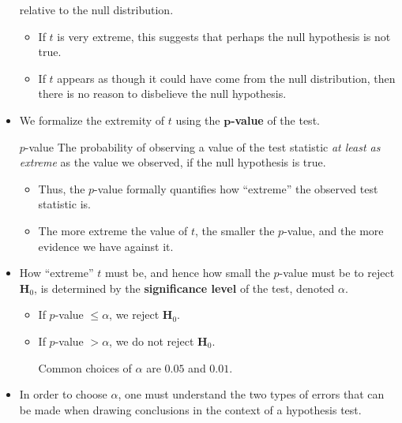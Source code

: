 \begin{itemize}
          relative to the null distribution.
          \begin{itemize}
              \item If $ t $ is very extreme, this suggests that perhaps the null hypothesis
                    is not true.
              \item If $ t $ appears as though it could have come from the null distribution, then
                    there is no reason to disbelieve the null hypothesis.
          \end{itemize}
    \item We formalize the extremity of $ t $ using the \textbf{$ \symbf{p} $-value} of the test.

          \begin{Definition}{$ p $-value}{}
              The probability of observing a value of the test statistic \emph{at least as extreme}
              as the value we observed, if the null hypothesis is true.
          \end{Definition}
          \begin{itemize}
              \item Thus, the $ p $-value formally quantifies how ``extreme'' the observed
                    test statistic is.
              \item The more extreme the value of $ t $, the smaller the $ p $-value, and the more
                    evidence we have against it.
          \end{itemize}
    \item How ``extreme'' $ t $ must be, and hence how small the $ p $-value must be
          to reject $ \mathbf{H}_0 $, is determined by the \textbf{significance level} of the test,
          denoted $ \alpha $.
          \begin{itemize}
              \item If $ p $-value $ \le \alpha $, we reject $ \mathbf{H}_0 $.
              \item If $ p $-value $ >\alpha $, we do not reject $ \mathbf{H}_0 $.
                    \begin{Remark}{}{}
                        Common choices of $ \alpha $ are $ 0.05 $ and $ 0.01 $.
                    \end{Remark}
          \end{itemize}
    \item In order to choose $ \alpha $, one must understand the two types of errors
          that can be made when drawing conclusions in the context of a hypothesis test.

\end{itemize}
